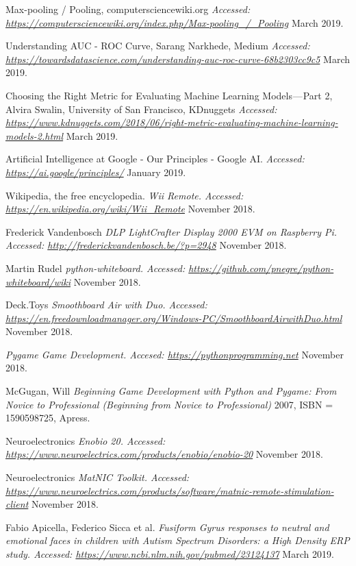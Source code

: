 \begin{thebibliography}{1}
 Max-pooling / Pooling, computersciencewiki.org {\em Accessed: \url{https://computersciencewiki.org/index.php/Max-pooling_/_Pooling}} March 2019.

 Understanding AUC - ROC Curve, Sarang Narkhede, Medium {\em Accessed: \url{https://towardsdatascience.com/understanding-auc-roc-curve-68b2303cc9c5}} March 2019.

 Choosing the Right Metric for Evaluating Machine Learning Models — Part 2, Alvira Swalin, University of San Francisco, KDnuggets {\em Accessed: \url{https://www.kdnuggets.com/2018/06/right-metric-evaluating-machine-learning-models-2.html}} March 2019.

 Artificial Intelligence at Google - Our Principles - Google AI. {\em Accessed: \url{https://ai.google/principles/}} January 2019.

 Wikipedia, the free encyclopedia. {\em Wii Remote. Accessed:  \url{https://en.wikipedia.org/wiki/Wii_Remote}} November 2018.

 Frederick Vandenbosch {\em DLP LightCrafter Display 2000 EVM on Raspberry Pi. Accessed:  \url{http://frederickvandenbosch.be/?p=2948}} November 2018.

 Martin Rudel {\em python-whiteboard. Accessed:  \url{https://github.com/pnegre/python-whiteboard/wiki}} November 2018.

 Deck.Toys {\em Smoothboard Air with Duo. Accessed:  \url{https://en.freedownloadmanager.org/Windows-PC/SmoothboardAirwithDuo.html}} November 2018.

 {\em Pygame Game Development. Accesed: \url{https://pythonprogramming.net}} November 2018.

 McGugan, Will {\em Beginning Game Development with Python and Pygame: From Novice to Professional (Beginning from Novice to Professional)} 2007, ISBN = 1590598725, Apress.

 Neuroelectronics {\em Enobio 20. Accessed:  \url{https://www.neuroelectrics.com/products/enobio/enobio-20}} November 2018.

 Neuroelectronics {\em MatNIC Toolkit. Accessed:  \url{https://www.neuroelectrics.com/products/software/matnic-remote-stimulation-client}} November 2018.

 Fabio Apicella, Federico Sicca et al. {\em Fusiform Gyrus responses to neutral and emotional faces in children with Autism Spectrum Disorders: a High Density ERP study. Accessed:  \url{https://www.ncbi.nlm.nih.gov/pubmed/23124137}} March 2019.


\end{thebibliography}
